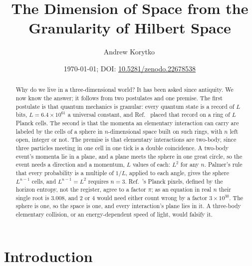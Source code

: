 \documentclass[aps,prd,twocolumn,superscriptaddress,nofootinbib]{revtex4-2}
\begin{document}
\title{The Dimension of Space from the Granularity of Hilbert Space}

\author{Andrew Korytko\,}

\date{\today; DOI: \href{https://doi.org/10.5281/zenodo.22678538}{10.5281/zenodo.22678538}}

\begin{abstract}
Why do we live in a three-dimensional world? It has been asked since antiquity. We now know the answer; it follows from two postulates and one premise. The first postulate is that quantum mechanics is granular: every quantum state is a record of $L$ bits, $L = 6.4\times10^{61}$ a universal constant, and Ref.~\cite{korytko2026c} placed that record on a ring of $L$ Planck cells. The second is that the momenta an elementary interaction can carry are labeled by the cells of a sphere in $n$-dimensional space built on such rings, with $n$ left open, integer or not. The premise is that elementary interactions are two-body, since three particles meeting in one cell in one tick is a double coincidence. A two-body event's momenta lie in a plane, and a plane meets the sphere in one great circle, so the event needs a direction and a momentum, $L$ values of each: $L^2$ for any $n$. Palmer's rule that every probability is a multiple of $1/L$, applied to each angle, gives the sphere $L^{n-1}$ cells, and $L^{n-1} = L^2$ requires $n = 3$. Ref.~\cite{korytko2026}'s Planck pixels, defined by the horizon entropy, not the register, agree to a factor $\pi$; as an equation in real $n$ their single root is $3.008$, and 2 or 4 would need either count wrong by a factor $3\times10^{30}$. The sphere is one, so the space is one, and every interaction's plane lies in it. A three-body elementary collision, or an energy-dependent speed of light, would falsify it.
\end{abstract}


\maketitle

\section{Introduction}
\label{sec:intro}
\end{document}
